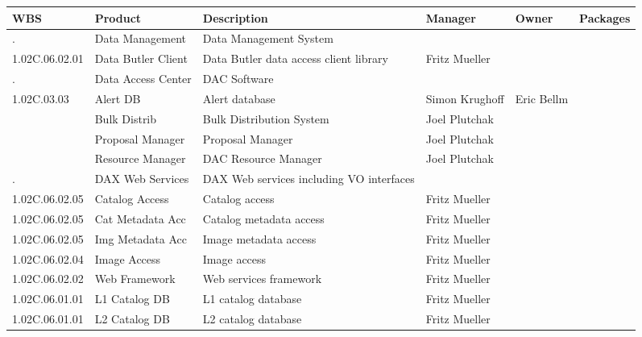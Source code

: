 \begin{longtable}{|p{}|p{}|p{}|p{}|p{}|p{}|}\hline 
 \bf WBS & Product & Description & Manager & Owner & Packages\\ \hline   
{\tiny .} & {\small Data Management} & Data Management System &  &  & \\ \hline 
{\tiny 1.02C.06.02.01} & {\small Data Butler Client} & Data Butler data access client library & Fritz Mueller &  & \\ \hline 
{\tiny .} & {\small Data Access Center} & DAC Software &  &  & \\ \hline 
{\tiny 1.02C.03.03} & {\small Alert DB} & Alert database & Simon Krughoff & Eric Bellm & \\ \hline 
{\tiny } & {\small Bulk Distrib} & Bulk Distribution System & Joel Plutchak &  & \\ \hline 
{\tiny } & {\small Proposal Manager} & Proposal Manager & Joel Plutchak &  & \\ \hline 
{\tiny } & {\small Resource Manager} & DAC Resource Manager & Joel Plutchak &  & \\ \hline 
{\tiny .} & {\small DAX Web Services} & DAX Web services including VO interfaces &  &  & \\ \hline 
{\tiny 1.02C.06.02.05} & {\small Catalog Access} & Catalog access & Fritz Mueller &  & \\ \hline 
{\tiny 1.02C.06.02.05} & {\small Cat Metadata Acc} & Catalog metadata access & Fritz Mueller &  & \\ \hline 
{\tiny 1.02C.06.02.05} & {\small Img Metadata Acc} & Image metadata access & Fritz Mueller &  & \\ \hline 
{\tiny 1.02C.06.02.04} & {\small Image Access} & Image access & Fritz Mueller &  & \\ \hline 
{\tiny 1.02C.06.02.02} & {\small Web Framework} & Web services framework & Fritz Mueller &  & \\ \hline 
{\tiny 1.02C.06.01.01} & {\small L1 Catalog DB} & L1 catalog database & Fritz Mueller &  & \\ \hline 
{\tiny 1.02C.06.01.01} & {\small L2 Catalog DB} & L2 catalog database & Fritz Mueller &  & \\ \hline 

\end{longtable}
